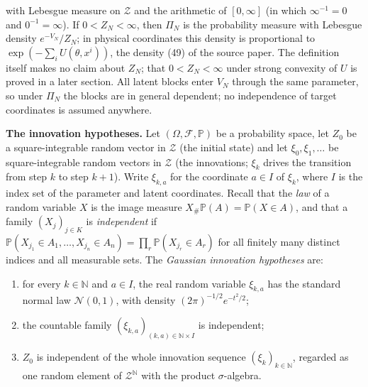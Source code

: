 \documentclass[11pt,a4paper]{article}
\begin{document}
with Lebesgue measure on \(\mathcal Z\) and the arithmetic of \([0,\infty]\) (in which \(\infty^{-1}=0\) and \(0^{-1}=\infty\)). If \(0<Z_N<\infty\), then \(\Pi_N\) is the probability measure with Lebesgue density \(e^{-V_N}/Z_N\); in physical coordinates this density is proportional to \(\exp(-\sum_iU(\theta,x^i))\), the density (49) of the source paper. The definition itself makes no claim about \(Z_N\); that \(0<Z_N<\infty\) under strong convexity of \(U\) is proved in a later section. All latent blocks enter \(V_N\) through the same parameter, so under \(\Pi_N\) the blocks are in general dependent; no independence of target coordinates is assumed anywhere.




\textbf{The innovation hypotheses.} Let \((\Omega,\mathcal F,\mathbb P)\) be a probability space, let \(Z_0\) be a square-integrable random vector in \(\mathcal Z\) (the initial state) and let \(\xi_0,\xi_1,\dots\) be square-integrable random vectors in \(\mathcal Z\) (the innovations; \(\xi_k\) drives the transition from step \(k\) to step \(k+1\)). Write \(\xi_{k,a}\) for the coordinate \(a\in I\) of \(\xi_k\), where \(I\) is the index set of the parameter and latent coordinates. Recall that the \emph{law} of a random variable \(X\) is the image measure \(X_\#\mathbb P(A)=\mathbb P(X\in A)\), and that a family \((X_j)_{j\in K}\) is \emph{independent} if \(\mathbb P(X_{j_1}\in A_1,\dots,X_{j_n}\in A_n)=\prod_r\mathbb P(X_{j_r}\in A_r)\) for all finitely many distinct indices and all measurable sets. The \emph{Gaussian innovation hypotheses} are:



\begin{enumerate}


\item for every \(k\in\mathbb N\) and \(a\in I\), the real random variable \(\xi_{k,a}\) has the standard normal law \(\mathcal N(0,1)\), with density \((2\pi)^{-1/2}e^{-t^2/2}\);

\item the countable family \((\xi_{k,a})_{(k,a)\in\mathbb N\times I}\) is independent;

\item \(Z_0\) is independent of the whole innovation sequence \((\xi_k)_{k\in\mathbb N}\), regarded as one random element of \(\mathcal Z^{\mathbb N}\) with the product \(\sigma\)-algebra.

\end{enumerate}
\end{document}
